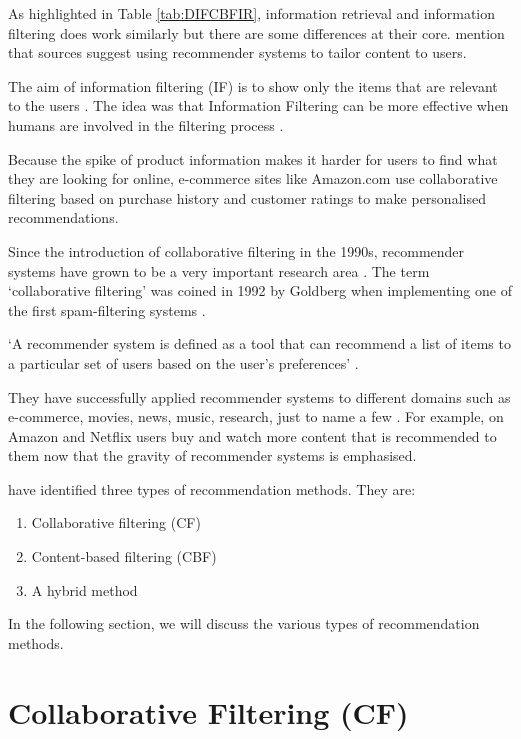 As highlighted in Table \ref{tab:DIFCBFIR}, information retrieval and information filtering does work similarly but there are some differences at their core.  mention that sources suggest using recommender systems to tailor content to users.

The aim of information filtering (IF) is to show only the items that are relevant to the users \cite{hanani2001information}. The idea was that Information Filtering can be more effective when humans are involved in the filtering process \cite{hanani2001information}.

Because the spike of product information makes it harder for users to find what they are looking for online, e-commerce sites like Amazon.com use collaborative filtering based on purchase history and customer ratings to make personalised recommendations.

Since the introduction of collaborative filtering in the 1990s, recommender systems have grown to be a very important research area \cite{resnick1994grouplens,shardanand1995social}. The term ‘collaborative filtering’ was coined in 1992 by Goldberg when implementing one of the first spam-filtering systems \cite{goldberg1992using}.

‘A recommender system is defined as a tool that can recommend a list of items to a particular set of users based on the user’s preferences’ \cite[p.~4]{ricci2011introduction}.

They have successfully applied recommender systems to different domains such as e-commerce, movies, news, music, research, just to name a few \cite{grau2009personalized}. For example, on Amazon and Netflix users buy and watch more content that is recommended to them \cite{Andre2018} now that the gravity of recommender systems is emphasised.

 have identified three types of recommendation methods. They are:
\begin{enumerate}
    \item Collaborative filtering (CF)
    \item Content-based filtering (CBF)
    \item A hybrid method
\end{enumerate}
In the following section, we will discuss the various types of recommendation methods.

\section{Collaborative Filtering (CF)}

